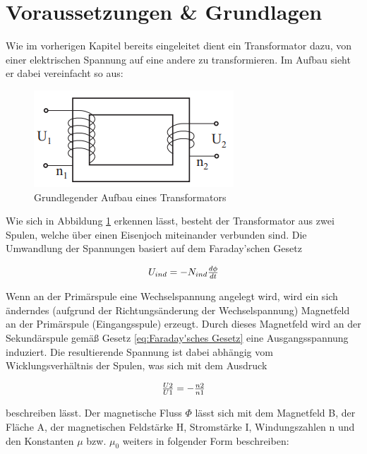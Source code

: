 \documentclass[12pt,a4paper,twoside]{article}
\begin{document}
\section{Voraussetzungen \& Grundlagen} %

Wie im vorherigen Kapitel bereits eingeleitet dient ein Transformator dazu, von einer elektrischen Spannung auf eine andere zu transformieren. Im Aufbau sieht er dabei vereinfacht so aus:

\begin{figure}[H]
    \centering
    \includegraphics[width=0.5\linewidth]{nudes/GL-TrafoAufbau.png}
    \caption{Grundlegender Aufbau eines Transformators \cite{teachcenter2}}
    \label{fig:Aufbau Transformator}
\end{figure}

\noindent
Wie sich in Abbildung \ref{fig:Aufbau Transformator} erkennen lässt, besteht der Transformator aus zwei Spulen, welche über einen Eisenjoch miteinander verbunden sind. Die Umwandlung der Spannungen basiert auf dem Faraday'schen Gesetz

    \begin{equation}
        \label{eq:Faraday'sches Gesetz}
        \centerline{$U_{ind}=-N_{ind}\frac{d \phi}{dt}$}
    \end{equation}

\noindent
Wenn an der Primärspule eine Wechselspannung angelegt wird, wird ein sich änderndes (aufgrund der Richtungsänderung der Wechselspannung) Magnetfeld an der Primärspule (Eingangsspule) erzeugt. Durch dieses Magnetfeld wird an der Sekundärspule gemäß Gesetz \ref{eq:Faraday'sches Gesetz} eine Ausgangsspannung induziert. 
Die resultierende Spannung ist dabei abhängig vom Wicklungsverhältnis der Spulen, was sich mit dem Ausdruck

\begin{equation}
    \label{eq:Verhältnis Wicklungen/Spannung}
    \centerline{$\frac{U2}{U1}=-\frac{n2}{n1}$}
\end{equation}

\noindent
beschreiben lässt. Der magnetische Fluss $\Phi$ lässt sich mit dem Magnetfeld B, der Fläche A, der magnetischen Feldstärke H, Stromstärke I, Windungszahlen n und den Konstanten $\mu$ bzw. $\mu_{0}$ weiters in folgender Form beschreiben:
\end{document}
